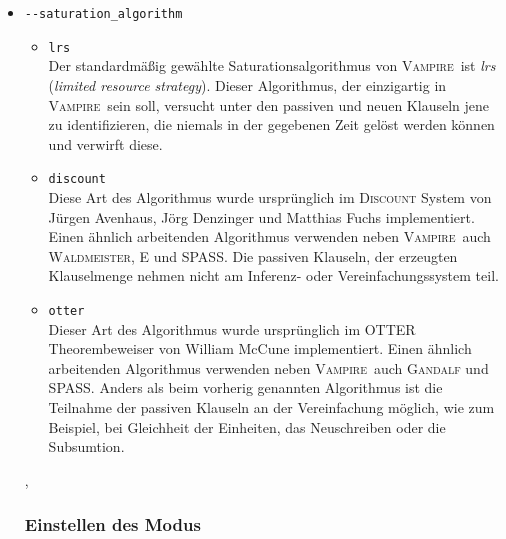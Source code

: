 \documentclass{article}
\newcommand{\vampire}{\textsc{Vampire}~}
\begin{document}
\begin{itemize}
\item \verb|--saturation_algorithm| \label{arg:saturationalgorithm}
\begin{itemize}
	\item \verb|lrs|\\
	Der standardmäßig gewählte Saturationsalgorithmus von \vampire ist \emph{lrs} (\emph{limited resource strategy}).
	Dieser Algorithmus, der einzigartig in \vampire sein soll, versucht unter den passiven und neuen Klauseln jene zu identifizieren, die niemals in der gegebenen Zeit gelöst werden können und verwirft diese.
	\item \verb|discount|\\
	Diese Art des Algorithmus wurde ursprünglich im \textsc{Discount} System von Jürgen Avenhaus, Jörg Denzinger und Matthias Fuchs implementiert.
	Einen ähnlich arbeitenden Algorithmus verwenden neben \vampire auch \textsc{Waldmeister}, \textsc{E} und \textsc{SPASS}. 
	Die passiven Klauseln, der erzeugten Klauselmenge nehmen nicht am Inferenz- oder Vereinfachungssystem teil.
	\item \verb|otter|\\
	Dieser Art des Algorithmus wurde ursprünglich im OTTER Theorembeweiser von William McCune implementiert.
	Einen ähnlich arbeitenden Algorithmus verwenden neben \vampire auch \textsc{Gandalf} und \textsc{SPASS}. 
	Anders als beim vorherig genannten Algorithmus ist die Teilnahme der passiven Klauseln an der Vereinfachung möglich, wie zum Beispiel, bei Gleichheit der Einheiten, das Neuschreiben oder die Subsumtion. 
\end{itemize}
\cite{cav2013}, \cite[S. 107]{riazanov2003limited}

	\subsubsection{Einstellen des Modus}


\end{itemize}
\end{document}
